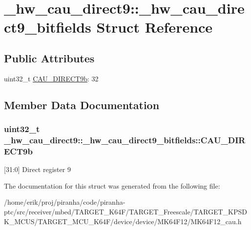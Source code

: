 \hypertarget{struct__hw__cau__direct9_1_1__hw__cau__direct9__bitfields}{}\section{\+\_\+hw\+\_\+cau\+\_\+direct9\+:\+:\+\_\+hw\+\_\+cau\+\_\+direct9\+\_\+bitfields Struct Reference}
\label{struct__hw__cau__direct9_1_1__hw__cau__direct9__bitfields}
\subsection*{Public Attributes}
\begin{DoxyCompactItemize}
\item 
uint32\+\_\+t \hyperlink{struct__hw__cau__direct9_1_1__hw__cau__direct9__bitfields_ab3394a3dde3e9214f5e7badccd21fedb}{C\+A\+U\+\_\+\+D\+I\+R\+E\+C\+T9b}\+: 32
\end{DoxyCompactItemize}


\subsection{Member Data Documentation}
\subsubsection[{\texorpdfstring{C\+A\+U\+\_\+\+D\+I\+R\+E\+C\+T9b}{CAU_DIRECT9b}}]{\setlength{\rightskip}{0pt plus 5cm}uint32\+\_\+t \+\_\+hw\+\_\+cau\+\_\+direct9\+::\+\_\+hw\+\_\+cau\+\_\+direct9\+\_\+bitfields\+::\+C\+A\+U\+\_\+\+D\+I\+R\+E\+C\+T9b}\hypertarget{struct__hw__cau__direct9_1_1__hw__cau__direct9__bitfields_ab3394a3dde3e9214f5e7badccd21fedb}{}\label{struct__hw__cau__direct9_1_1__hw__cau__direct9__bitfields_ab3394a3dde3e9214f5e7badccd21fedb}
\mbox{[}31\+:0\mbox{]} Direct register 9 

The documentation for this struct was generated from the following file\+:\begin{DoxyCompactItemize}
\item 
/home/erik/proj/piranha/code/piranha-\/ptc/src/receiver/mbed/\+T\+A\+R\+G\+E\+T\+\_\+\+K64\+F/\+T\+A\+R\+G\+E\+T\+\_\+\+Freescale/\+T\+A\+R\+G\+E\+T\+\_\+\+K\+P\+S\+D\+K\+\_\+\+M\+C\+U\+S/\+T\+A\+R\+G\+E\+T\+\_\+\+M\+C\+U\+\_\+\+K64\+F/device/device/\+M\+K64\+F12/M\+K64\+F12\+\_\+cau.\+h\end{DoxyCompactItemize}
